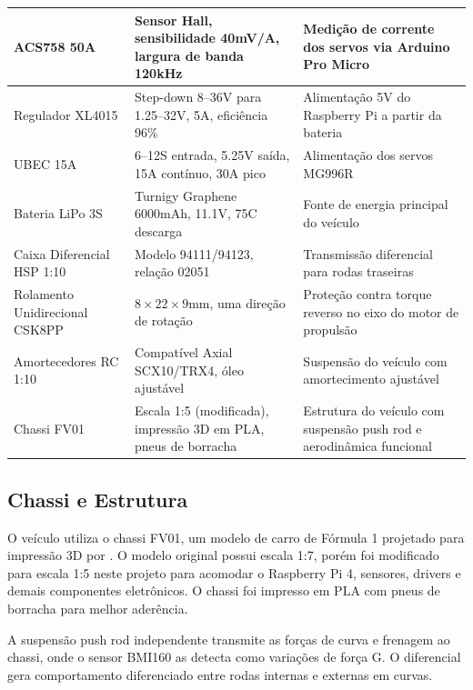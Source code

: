 \begin{table}[!h]
{\begin{tabular}{p{3.5cm}p{6cm}p{6cm}}
		\midrule
		ACS758 50A \cite{allegro2018acs758} & Sensor Hall, sensibilidade 40mV/A, largura de banda 120kHz & Medição de corrente dos servos via Arduino Pro Micro \\
		\midrule
		Regulador XL4015 \cite{xlsemi2017xl4015} & Step-down 8--36V para 1.25--32V, 5A, eficiência 96\% & Alimentação 5V do Raspberry Pi a partir da bateria \\
		\midrule
		UBEC 15A & 6--12S entrada, 5.25V saída, 15A contínuo, 30A pico & Alimentação dos servos MG996R \\
		\midrule
		Bateria \gls{LiPo} 3S & Turnigy Graphene 6000mAh, 11.1V, 75C descarga & Fonte de energia principal do veículo \\
		\midrule
		Caixa Diferencial HSP 1:10 & Modelo 94111/94123, relação 02051 & Transmissão diferencial para rodas traseiras \\
		\midrule
		Rolamento Unidirecional CSK8PP & $8\times22\times9$mm, uma direção de rotação & Proteção contra torque reverso no eixo do motor de propulsão \\
		\midrule
		Amortecedores RC 1:10 & Compatível Axial SCX10/TRX4, óleo ajustável & Suspensão do veículo com amortecimento ajustável \\
		\midrule
		Chassi FV01 & Escala 1:5 (modificada), impressão 3D em \gls{PLA}, pneus de borracha & Estrutura do veículo com suspensão push rod e aerodinâmica funcional \\
		\bottomrule
	\end{tabular}%
}{%
%
}
\end{table}

\subsection{Chassi e Estrutura}
\label{subsec:chassi-estrutura-veiculo}

O veículo utiliza o chassi FV01, um modelo de carro de Fórmula 1 projetado para impressão 3D por . O modelo original possui escala 1:7, porém foi modificado para escala 1:5 neste projeto para acomodar o Raspberry Pi 4, sensores, drivers e demais componentes eletrônicos. O chassi foi impresso em PLA com pneus de borracha para melhor aderência.

A suspensão push rod independente transmite as forças de curva e frenagem ao chassi, onde o sensor BMI160 as detecta como variações de força G. O diferencial gera comportamento diferenciado entre rodas internas e externas em curvas.

